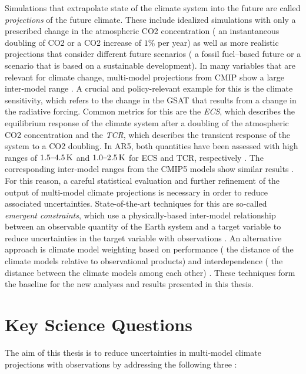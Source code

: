 Simulations that extrapolate state of the climate system into the future are
called \emph{projections} of the future climate. These include idealized
simulations with only a prescribed change in the atmospheric \ac{CO2}
concentration (\eg{} an instantaneous doubling of \ac{CO2} or a \ac{CO2}
increase of $1 \unit{\%}$ per year) as well as more realistic projections that
consider different future scenarios (\eg{} a fossil fuel--based future or a
scenario that is based on a sustainable development). In many variables that
are relevant for climate change, multi-model projections from \ac{CMIP} show a
large inter-model range \autocite{Collins2013, Flato2013}. A crucial and
policy-relevant example for this is the climate sensitivity, which refers to
the change in the \ac{GSAT} that results from a change in the radiative
forcing. Common metrics for this are the \emph{\ac{ECS}}, which describes the
equilibrium response of the climate system after a doubling of the atmospheric
\ac{CO2} concentration and the \emph{\ac{TCR}}, which describes the transient
response of the system to a \ac{CO2} doubling. In \acs{AR}5, both quantities
have been assessed with high ranges of $\rangeunit{1.5}{4.5}{K}$ and
$\rangeunit{1.0}{2.5}{K}$ for \ac{ECS} and \ac{TCR}, respectively
\autocite{Stocker2013}. The corresponding inter-model ranges from the
\acs{CMIP}5 models show similar results \autocite{Flato2013}. For this reason,
a careful statistical evaluation and further refinement of the output of
multi-model climate projections is necessary in order to reduce associated
uncertainties. State-of-the-art techniques for this are so-called
\emph{emergent constraints}, which use a physically-based inter-model
relationship between an observable quantity of the Earth system and a target
variable to reduce uncertainties in the target variable with observations
\autocite{Allen2002}. An alternative approach is climate model weighting based
on performance (\ie{} the distance of the climate models relative to
observational products) and interdependence (\ie{} the distance between the
climate models among each other) \autocite{Knutti2017a}. These techniques form
the baseline for the new analyses and results presented in this thesis.


\section{Key Science Questions}
\label{sec:01:key_science_questions}

The aim of this thesis is to reduce uncertainties in multi-model climate
projections with observations by addressing the following three
:

